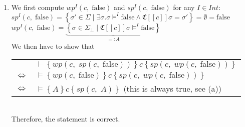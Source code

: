 \documentclass[12pt]{scrartcl}
\newcommand{\lbr}{[\![}
\newcommand{\rbr}{]\!]}
\begin{document}
	\begin{enumerate}
	\item[] We first compute $wp^{I}\left(c,\;\text{false}\right)$ and $sp^{I}\left(c,\;\text{false}\right)$ for any $I\in Int$:\\
	
	$sp^{I}\left(c,\;\text{false}\right)=\left\{\sigma'\in\Sigma\; |\; \exists\sigma .\sigma\models^{I}\text{false}\wedge\mathfrak{C}\lbr c\rbr\sigma=\sigma'\right\}=\emptyset=\text{false}$\\
	$wp^{I}\left(c,\;\text{false}\right)=\underbrace{\left\{\sigma\in\Sigma_{\bot}\; |\; \mathfrak{C}\lbr c\rbr\sigma\models^{I}\text{false}\right\}}_{=:A}$\\
	
	We then have to show that\\
	
	\begin{tabular}{cl}
					  & $\models\left\{wp\left(c,\;sp\left(c,\;\text{false}\right)\right)\right\}c\left\{sp\left(c,\;wp\left(c,\;\text{false}\right)\right)\right\}$\\
	$\Leftrightarrow$ & $\models\left\{wp\left(c,\;\text{false}\right)\right\}c\left\{sp\left(c,\;wp\left(c,\;\text{false}\right)\right)\right\}$\\
	$\Leftrightarrow$ & $\models\left\{A\right\}c\left\{sp\left(c,\;A\right)\right\}$ \qquad (this is always true, see (a))\\
	\end{tabular}\\
	
	Therefore, the statement is correct.
	\end{enumerate}
\end{document}
